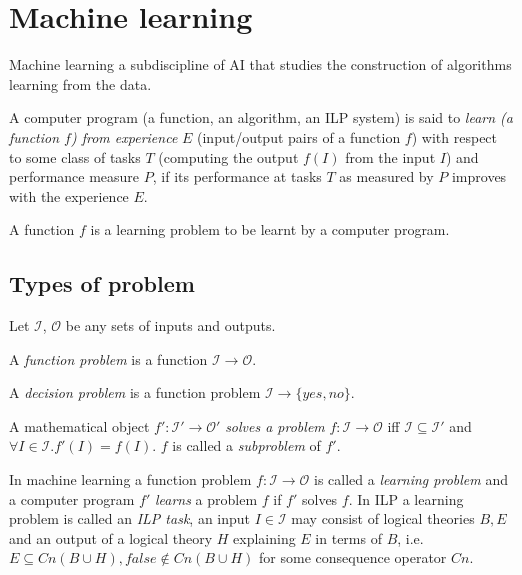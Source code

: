 \section{Machine learning}
Machine learning a subdiscipline of AI that studies the construction of algorithms learning from the data.

\begin{defn}\cite{mitchell1997machine}
A computer program (a function, an algorithm, an ILP system) is said to \emph{learn (a function $f$) from experience} $E$ (input/output pairs of a function $f$)
with respect to some class of tasks $T$ (computing the output $f(I)$ from the input $I$) and performance measure $P$,
if its performance at tasks $T$ as measured by $P$ improves with the experience $E$.
\end{defn}

\begin{remark}
A function $f$ is a learning problem to be learnt by a computer program.
\end{remark}

\subsection{Types of problem}
Let $\mathcal{I}$, $\mathcal{O}$ be any sets of inputs and outputs.

\begin{defn}
A \emph{function problem} is a function $\mathcal{I} \to \mathcal{O}$.
\end{defn}

\begin{defn}
A \emph{decision problem} is a function problem $\mathcal{I} \to \{yes, no\}$.
\end{defn}

\begin{defn}
A mathematical object $f':\mathcal{I}' \to \mathcal{O}'$ \emph{solves a problem} $f:\mathcal{I} \to \mathcal{O}$ iff $\mathcal{I} \subseteq \mathcal{I}'$ and
$\forall I \in \mathcal{I}. f'(I)=f(I)$.
$f$ is called a \emph{subproblem} of $f'$.
\end{defn}

In machine learning a function problem $f:\mathcal{I} \to \mathcal{O}$ is called a \emph{learning problem} and a computer program $f'$ \emph{learns} a problem $f$ if $f'$ solves $f$. In ILP a learning problem is called an \emph{ILP task}, an input $I \in \mathcal{I}$ may consist of logical theories $B, E$ and an output of a logical theory $H$ explaining $E$ in terms of $B$, i.e. $E \subseteq Cn(B \cup H), false \not\in Cn(B \cup H)$ for some consequence operator $Cn$.
